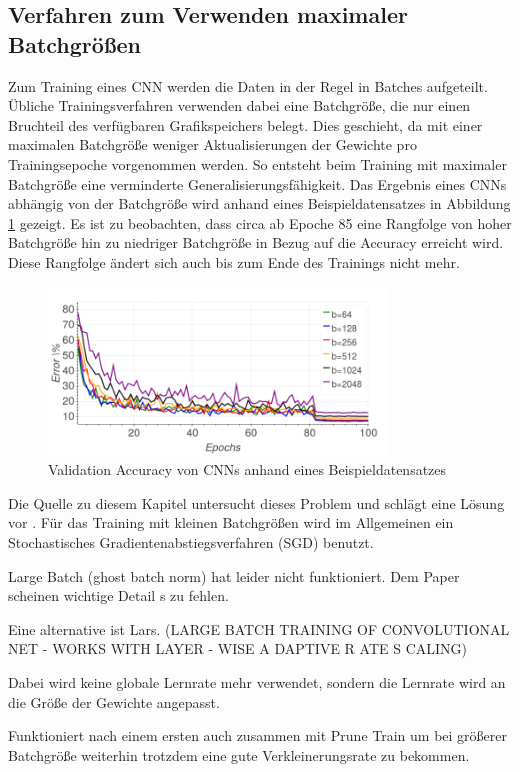 \subsection{Verfahren zum Verwenden maximaler Batchgrößen}
Zum Training eines CNN werden die Daten in der Regel in Batches aufgeteilt. Übliche Trainingsverfahren verwenden dabei eine Batchgröße, die nur einen Bruchteil des verfügbaren Grafikspeichers belegt. Dies geschieht, da mit einer maximalen Batchgröße weniger Aktualisierungen der Gewichte pro Trainingsepoche vorgenommen werden. So entsteht beim Training mit maximaler Batchgröße eine verminderte Generalisierungsfähigkeit. Das Ergebnis eines CNNs abhängig von der Batchgröße wird anhand eines Beispieldatensatzes in Abbildung \ref{abb:largeB1} gezeigt. Es ist zu beobachten, dass circa ab Epoche 85 eine Rangfolge von hoher Batchgröße hin zu niedriger Batchgröße in Bezug auf die Accuracy erreicht wird. Diese Rangfolge ändert sich auch bis zum Ende des Trainings nicht mehr. 


\begin{figure}[h]
 \centering
 \includegraphics[width=0.8\textwidth]{KapitelPartA/images/batchSize1.png}
 \caption{Validation Accuracy von CNNs anhand eines Beispieldatensatzes}
 \label{abb:largeB1}
\end{figure}


Die Quelle zu diesem Kapitel untersucht dieses Problem und schlägt eine Lösung vor \cite{lars}.
Für das Training mit kleinen Batchgrößen wird im Allgemeinen ein Stochastisches Gradientenabstiegsverfahren (SGD) benutzt. 


Large Batch (ghost batch norm) hat leider nicht funktioniert. Dem Paper scheinen wichtige Detail s zu fehlen.

Eine alternative ist Lars. (LARGE BATCH TRAINING OF CONVOLUTIONAL NET -
WORKS WITH LAYER - WISE A DAPTIVE R ATE S CALING)

Dabei wird keine globale Lernrate mehr verwendet, sondern die Lernrate wird an die Größe der Gewichte angepasst. 

Funktioniert nach einem ersten auch zusammen mit Prune Train um bei größerer Batchgröße weiterhin trotzdem eine gute Verkleinerungsrate zu bekommen.
\color{black}
